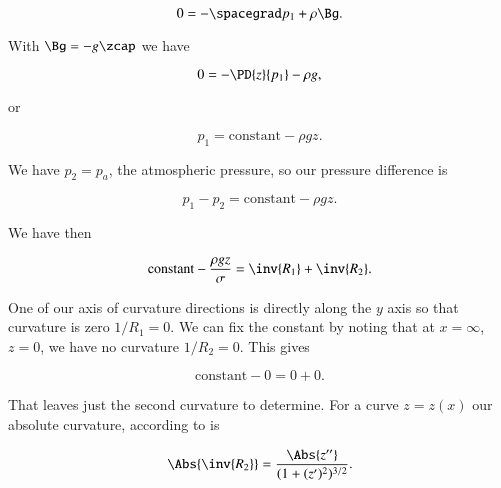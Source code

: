 \begin{equation}\label{eqn:continuumFluidsReview:1630}
0 = -\spacegrad p_1 + \rho \Bg.
\end{equation}

With $\Bg = -g \zcap$ we have

\begin{equation}\label{eqn:continuumFluidsReview:1650}
0 = -\PD{z}{p_1} - \rho g,
\end{equation}

or

\begin{equation}\label{eqn:continuumFluidsReview:1670}
p_1 = \text{constant} - \rho g z.
\end{equation}

%

We have $p_2 = p_a$, the atmospheric pressure, so our pressure difference is

\begin{equation}\label{eqn:continuumFluidsReview:1570}
p_1 - p_2 = \text{constant} - \rho g z.
\end{equation}

We have then

\begin{equation}\label{eqn:continuumFluidsReview:1590}
\text{constant} -\frac{\rho g z}{\sigma} = \inv{R_1} + \inv{R_2}.
\end{equation}

One of our axis of curvature directions is directly along the $y$ axis so that curvature is zero $1/R_1 = 0$.  We can fix the constant by noting that at $x = \infty$, $z = 0$, we have no curvature $1/R_2 = 0$.  This gives

\begin{equation}\label{eqn:continuumFluidsReview:1690}
\text{constant} -0 = 0 + 0.
\end{equation}

That leaves just the second curvature to determine.  For a curve $z = z(x)$ our absolute curvature, according to \cite{wiki:curvature} is

\begin{equation}\label{eqn:continuumFluidsReview:1610}
\Abs{\inv{R_2}} = \frac{\Abs{z''}}{(1 + (z')^2)^{3/2}}.
\end{equation}

